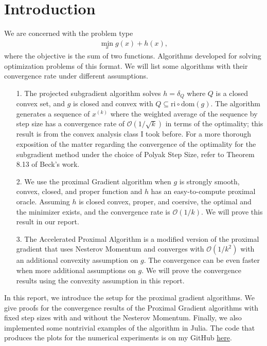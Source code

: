 \documentclass[]{article}
\theoremstyle{definition}
\begin{document}
\section{Introduction}
    We are concerned with the problem type
    \begin{align}
        \min_{x} g(x) + h(x),
    \end{align}
    where the objective is the sum of two functions. Algorithms developed for solving optimization problems of this format. We will list some algorithms with their convergence rate under different assumptions. 
    \begin{enumerate}
        \item [1.] The projected subgradient algorithm solves $h = \delta_Q$ where $Q$ is a closed convex set, and $g$ is closed and convex with $Q\subseteq\text{ri}\circ \text{dom}(g)$. The algorithm generates a sequence of $x^{(k)}$ where the weighted average of the sequence by step size has a convergence rate of $\mathcal O(1/\sqrt{k})$ in terms of the optimality; this result is from the convex analysis class I took before. For a more thorough exposition of the matter regarding the convergence of the optimality for the subgradient method under the choice of Polyak Step Size, refer to Theorem 8.13 of Beck's work\cite{book:first_order_opt}. 
        \item [2.] We use the proximal Gradient algorithm when $g$ is strongly smooth, convex, closed, and proper function and $h$ has an easy-to-compute proximal oracle. Assuming $h$ is closed convex, proper, and coersive, the optimal and the minimizer exists, and the convergence rate is $\mathcal O(1/k)$. We will prove this result in our report. 
        \item [3.] The Accelerated Proximal Algorithm is a modified version of the proximal gradient that uses Nesterov Momentum and converges with $\mathcal O(1/k^2)$ with an additional convexity assumption on $g$. The convergence can be even faster when more additional assumptions on $g$. We will prove the convergence results using the convexity assumption in this report.  
    \end{enumerate}
    In this report, we introduce the setup for the proximal gradient algorithms. We give proofs for the convergence results of the Proximal Gradient algorithms with fixed step sizes with and without the Nesterov Momentum. Finally, we also implemented some nontrivial examples of the algorithm in Julia\cite{bezanson2012julia}. The code that produces the plots for the numerical experiments is on my GitHub \href{https://github.com/iluvjava/Proximal-Gradient}{here}. 
\end{document}
